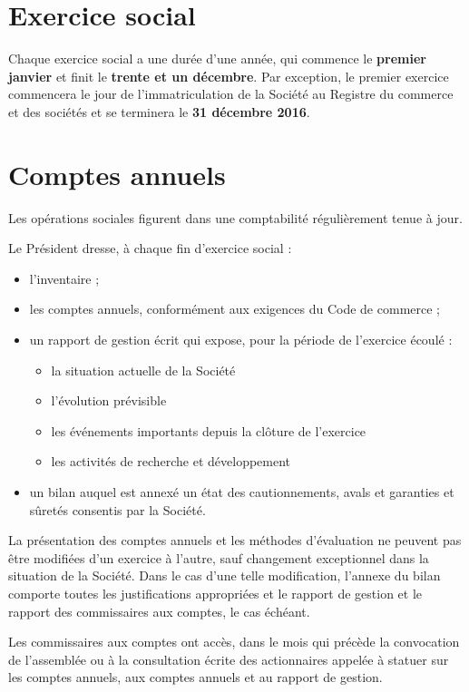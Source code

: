 \documentclass[a4paper,12pt]{report}
\begin{document}
\section{Exercice social}
Chaque exercice social a une durée d'une année, qui commence le \textbf{premier janvier} et finit le \textbf{trente et un décembre}. 
Par exception, le premier exercice commencera le jour de l'immatriculation de la Société au Registre du commerce et des sociétés et se terminera le \textbf{31 décembre 2016}.

\section{Comptes annuels}
Les opérations sociales figurent dans une comptabilité régulièrement tenue à jour.

Le Président dresse, à chaque fin d'exercice social :
\begin{itemize}
	\item l'inventaire ;
	\item les comptes annuels, conformément aux exigences du Code de commerce ;
	\item un rapport de gestion écrit qui expose, pour la période de l'exercice écoulé :
		\begin{itemize}
			\item la situation actuelle de la Société
			\item l'évolution prévisible
			\item les événements importants depuis la clôture de l'exercice
			\item les activités de recherche et développement
		\end{itemize}
	\item un bilan auquel est annexé un état des cautionnements, avals et garanties et sûretés consentis par la Société.
\end{itemize}

La présentation des comptes annuels et les méthodes d'évaluation ne peuvent pas être modifiées d'un exercice à l'autre, sauf changement exceptionnel dans la situation de la Société. Dans le cas d'une telle modification, l'annexe du bilan comporte toutes les justifications appropriées et le rapport de gestion et le rapport des commissaires aux comptes, le cas échéant.

Les commissaires aux comptes ont accès, dans le mois qui précède la convocation de l'assemblée ou à la consultation écrite des actionnaires appelée à statuer sur les comptes annuels, aux comptes annuels et au rapport de gestion.
\end{document}
